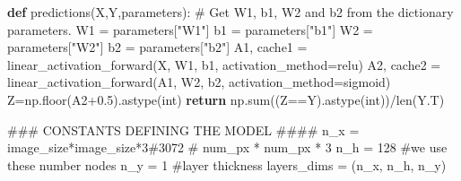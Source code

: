 \documentclass[
  letterpaper,
  DIV=11,
  numbers=noendperiod]{scrartcl}
\newenvironment{Shaded}{\begin{snugshade}}{\end{snugshade}}
\newcommand{\BuiltInTok}[1]{\textcolor[rgb]{0.00,0.23,0.31}{#1}}
\newcommand{\CommentTok}[1]{\textcolor[rgb]{0.37,0.37,0.37}{#1}}
\newcommand{\ControlFlowTok}[1]{\textcolor[rgb]{0.00,0.23,0.31}{\textbf{#1}}}
\newcommand{\DecValTok}[1]{\textcolor[rgb]{0.68,0.00,0.00}{#1}}
\newcommand{\FloatTok}[1]{\textcolor[rgb]{0.68,0.00,0.00}{#1}}
\newcommand{\KeywordTok}[1]{\textcolor[rgb]{0.00,0.23,0.31}{\textbf{#1}}}
\newcommand{\NormalTok}[1]{\textcolor[rgb]{0.00,0.23,0.31}{#1}}
\newcommand{\OperatorTok}[1]{\textcolor[rgb]{0.37,0.37,0.37}{#1}}
\newcommand{\StringTok}[1]{\textcolor[rgb]{0.13,0.47,0.30}{#1}}
\begin{document}
\begin{Shaded}
\begin{Highlighting}[]
\KeywordTok{def}\NormalTok{ predictions(X,Y,parameters):}
    \CommentTok{\# Get W1, b1, W2 and b2 from the dictionary parameters.}
\NormalTok{    W1 }\OperatorTok{=}\NormalTok{ parameters[}\StringTok{"W1"}\NormalTok{]}
\NormalTok{    b1 }\OperatorTok{=}\NormalTok{ parameters[}\StringTok{"b1"}\NormalTok{]}
\NormalTok{    W2 }\OperatorTok{=}\NormalTok{ parameters[}\StringTok{"W2"}\NormalTok{]}
\NormalTok{    b2 }\OperatorTok{=}\NormalTok{ parameters[}\StringTok{"b2"}\NormalTok{]}
\NormalTok{    A1, cache1 }\OperatorTok{=}\NormalTok{ linear\_activation\_forward(X, W1, b1, activation\_method}\OperatorTok{=}\StringTok{\textquotesingle{}relu\textquotesingle{}}\NormalTok{)}
\NormalTok{    A2, cache2 }\OperatorTok{=}\NormalTok{ linear\_activation\_forward(A1, W2, b2, activation\_method}\OperatorTok{=}\StringTok{\textquotesingle{}sigmoid\textquotesingle{}}\NormalTok{)}
\NormalTok{    Z}\OperatorTok{=}\NormalTok{np.floor(A2}\OperatorTok{+}\FloatTok{0.5}\NormalTok{).astype(}\BuiltInTok{int}\NormalTok{)}
    \ControlFlowTok{return}\NormalTok{ np.}\BuiltInTok{sum}\NormalTok{((Z}\OperatorTok{==}\NormalTok{Y).astype(}\BuiltInTok{int}\NormalTok{))}\OperatorTok{/}\BuiltInTok{len}\NormalTok{(Y.T)}
\end{Highlighting}
\end{Shaded}

\begin{Shaded}
\begin{Highlighting}[]
\CommentTok{\#\#\# CONSTANTS DEFINING THE MODEL \#\#\#\#}
\NormalTok{n\_x }\OperatorTok{=}\NormalTok{ image\_size}\OperatorTok{*}\NormalTok{image\_size}\OperatorTok{*}\DecValTok{3}\CommentTok{\#3072     \# num\_px * num\_px * 3}
\NormalTok{n\_h }\OperatorTok{=} \DecValTok{128}  \CommentTok{\#we use these number nodes}
\NormalTok{n\_y }\OperatorTok{=} \DecValTok{1} \CommentTok{\#layer thickness}
\NormalTok{layers\_dims }\OperatorTok{=}\NormalTok{ (n\_x, n\_h, n\_y)}
\end{Highlighting}
\end{Shaded}
\end{document}
